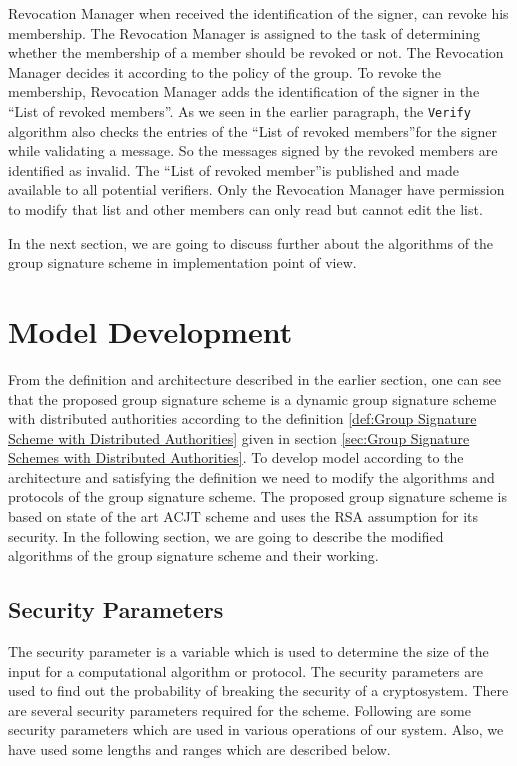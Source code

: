 Revocation Manager when received the identification of the signer, can revoke his membership. The Revocation Manager is assigned to the task of determining whether the membership of a member should be revoked or not. The Revocation Manager decides it according to the policy of the group. To revoke the membership, Revocation Manager adds the identification of the signer in the \textquotedblleft List of revoked members\textquotedblright. As we seen in the earlier paragraph, the \texttt{Verify} algorithm also checks the entries of the \textquotedblleft List of revoked members\textquotedblright for the signer while validating a message. So the messages signed by the revoked members are identified as invalid. The \textquotedblleft List of revoked member\textquotedblright is published and made available to all potential verifiers. Only the Revocation Manager have permission to modify that list and other members can only read but cannot edit the list. 

In the next section, we are going to discuss further about the algorithms of the group signature scheme in implementation point of view.

\section{Model Development}
From the definition and architecture described in the earlier section, one can see that the proposed group signature scheme is a dynamic group signature scheme with distributed authorities according to the definition \ref{def:Group Signature Scheme with Distributed Authorities} given in section \ref{sec:Group Signature Schemes with Distributed Authorities}.  To develop model according to the architecture and satisfying the definition we need to modify the algorithms and protocols of the group signature scheme. The proposed group signature scheme is based on state of the art ACJT scheme and uses the RSA assumption for its security. In the following section, we are going to describe the modified algorithms of the group signature scheme and their working.

\subsection{Security Parameters}
The security parameter is a variable which is used to determine the size of the input for a computational algorithm or protocol. The security parameters are used to find out the probability of breaking the security of a cryptosystem. There are several security parameters required for the scheme. Following are some security parameters which are used in various operations of our system. Also, we have used some lengths and ranges which are described below. 

